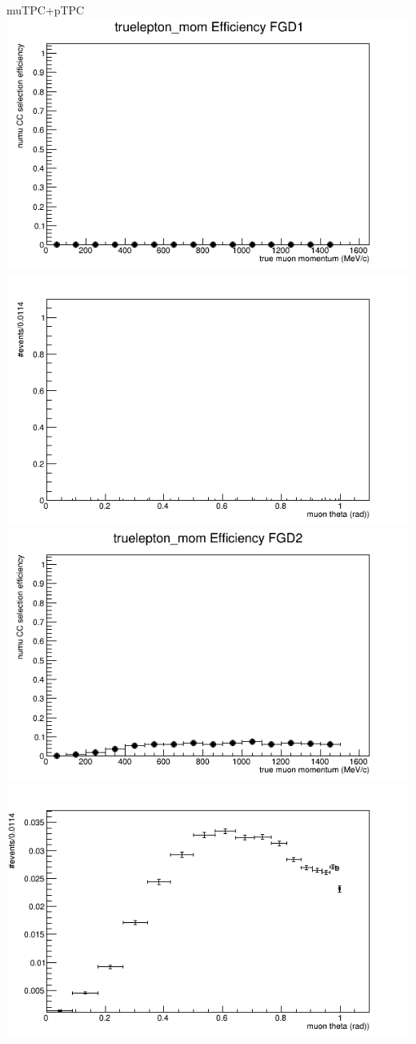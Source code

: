 \documentclass{beamer}
\begin{document}
\begin{frame}{muTPC+pTPC}
\center
\includegraphics[width=.45\textwidth]{images/Eff_truelepton_mom_topology_muTPC+pTPC_accum_level[][0][18]_data_mc.png}
\includegraphics[width=.45\textwidth]{images/Eff_truelepton_costheta_topology_muTPC+pTPC_accum_level[][0][18]_data_mc.png}
\includegraphics[width=.45\textwidth]{images/Eff_truelepton_mom_fgd2topology_muTPC+pTPC_accum_level[][1][18]_data_mc.png}
\includegraphics[width=.45\textwidth]{images/Eff_truelepton_costheta_fgd2topology_muTPC+pTPC_accum_level[][1][18]_data_mc.png}
\end{frame}
\end{document}
